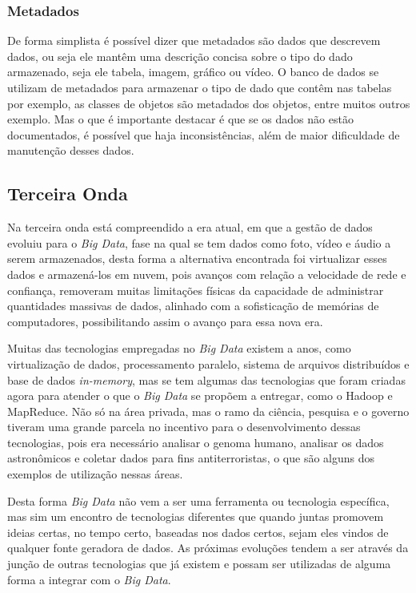 \subsubsection{Metadados}
\label{subsubsec:metadados}
De forma simplista é possível dizer que metadados são dados que descrevem dados, ou seja ele mantêm uma descrição concisa sobre o tipo do dado armazenado, seja ele tabela, imagem, gráfico ou vídeo. O banco de dados se utilizam de metadados para armazenar o tipo de dado que contêm nas tabelas por exemplo, as classes de objetos são metadados dos objetos, entre muitos outros exemplo. Mas o que é importante destacar é que se os dados não estão documentados, é possível que haja inconsistências, além de maior dificuldade de manutenção desses dados.~\cite{metadados}

\subsection{Terceira Onda}
\label{subsec:terceiraonda}
Na terceira onda está compreendido a era atual, em que a gestão de dados evoluiu para o \textit{Big Data}, fase na qual se tem dados como foto, vídeo e áudio a serem armazenados, desta forma a alternativa encontrada foi virtualizar esses dados e armazená-los em nuvem, pois avanços com relação a velocidade de rede e confiança, removeram muitas limitações físicas da capacidade de administrar quantidades massivas de dados, alinhado com a sofisticação de memórias de computadores, possibilitando assim o avanço para essa nova era.%

Muitas das tecnologias empregadas no \textit{Big Data} existem a anos, como virtualização de dados, processamento paralelo, sistema de arquivos distribuídos e base de dados \textit{in-memory}, mas se tem algumas das tecnologias que foram criadas agora para atender o que o \textit{Big Data} se propõem a entregar, como o Hadoop e MapReduce. Não só na área privada, mas o ramo da ciência, pesquisa e o governo tiveram uma grande parcela no incentivo para o desenvolvimento dessas tecnologias, pois era necessário analisar o genoma humano, analisar os dados astronômicos e coletar dados para fins antiterroristas, o que são alguns dos exemplos de utilização nessas áreas.%

Desta forma \textit{Big Data} não vem a ser uma ferramenta ou tecnologia específica, mas sim um encontro de tecnologias diferentes que quando juntas promovem ideias certas, no tempo certo, baseadas nos dados certos, sejam eles vindos de qualquer fonte geradora de dados. As próximas evoluções tendem a ser através da junção de outras tecnologias que já existem e possam ser utilizadas de alguma forma a integrar com o \textit{Big Data}.~\cite{leigos}

